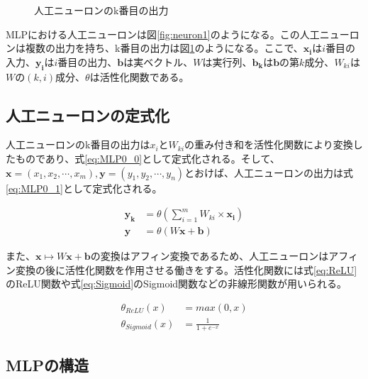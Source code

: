 \begin{figure}[b]
\begin{center}
\begin{minipage}{0.45\hsize}
\begin{center}
\caption{人工ニューロンのk番目の出力}
\label{fig:neuron2}
\end{center}
\end{minipage}
\end{center}
\end{figure}

MLPにおける人工ニューロンは図\ref{fig:neuron1}のようになる。この人工ニューロンは複数の出力を持ち、k番目の出力は図\ref{fig:neuron2}のようになる。ここで、$\boldsymbol{x_i}$は$i$番目の入力、$\boldsymbol{y_i}$は$i$番目の出力、$\boldsymbol{b}$は実ベクトル、$W$は実行列、$\boldsymbol{b_k}$は$\boldsymbol{b}$の第$k$成分、$W_{ki}$は$W$の$(k,i)$成分、$\theta$は活性化関数である。

\subsection{人工ニューロンの定式化}

人工ニューロンのk番目の出力は$x_i$と$W_{ki}$の重み付き和を活性化関数により変換したものであり、式\ref{eq:MLP0_0}として定式化される。そして、$\boldsymbol{x}=(x_1,x_2,\cdots,x_m),\boldsymbol{y}=(y_1,y_2,\cdots,y_n)$とおけば、人工ニューロンの出力は式\ref{eq:MLP0_1}として定式化される。

\begin{align}
    \label{eq:MLP0_0}
    \boldsymbol{y_k}&=\theta(\sum_{i=1}^{m} W_{ki} \times \boldsymbol{x_i})\\
    \label{eq:MLP0_1}
    \boldsymbol{y}&=\theta(W\boldsymbol{x}+\boldsymbol{b})
\end{align}

また、$\boldsymbol{x} \mapsto W\boldsymbol{x}+\boldsymbol{b}$の変換はアフィン変換であるため、人工ニューロンはアフィン変換の後に活性化関数を作用させる働きをする。活性化関数には式\ref{eq:ReLU}のReLU関数や式\ref{eq:Sigmoid}のSigmoid関数などの非線形関数が用いられる。

\begin{align}
    \label{eq:ReLU}
    \theta_{ReLU}(x)&=max(0,x)\\
    \label{eq:Sigmoid}
    \theta_{Sigmoid}(x)&=\frac{1}{1+e^{-x}}
\end{align}

\subsection{MLPの構造}

